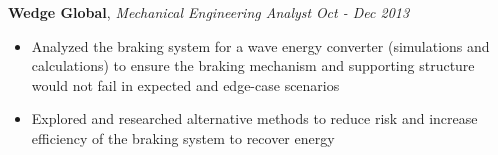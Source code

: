 \documentclass[9pt]{article}
\newenvironment{changemargin}[2]{%
  \begin{list}{}{%
    \setlength{\topsep}{0pt}%
    \setlength{\leftmargin}{#1}%
    \setlength{\rightmargin}{#2}%
    \setlength{\listparindent}{\parindent}%
    \setlength{\itemindent}{\parindent}%
    \setlength{\parsep}{\parskip}%
  }%
  \item[]}{\end{list}
}
\newcommand{\jobdescription}[1]{
	\begin{changemargin}{0.15in}{0.15in}
    \smallskip
		{#1}
    \medskip
	\end{changemargin}
}
\newcommand{\jobtitle}[3]{
	\textbf{#1}, \emph{#2} \hfill \emph{#3}\\
}
\newenvironment{body} {
	\vspace*{-16pt}
	\begin{changemargin}{-0.25in}{-0.5in}
  }	
	{\end{changemargin}
}
\begin{document}
\begin{body}
	\jobtitle{Wedge Global}{Mechanical Engineering Analyst}{Oct - Dec 2013}
  \jobdescription {
  	\begin{itemize} \itemsep -0pt  %
      \item Analyzed the braking system for a wave energy converter (simulations and calculations) to ensure the braking mechanism and supporting structure would not fail in expected and edge-case scenarios 
      \item Explored and researched alternative methods to reduce risk and increase efficiency of the braking system to recover energy\\
    \end{itemize}
  }

\end{body}

\medskip
\end{document}
